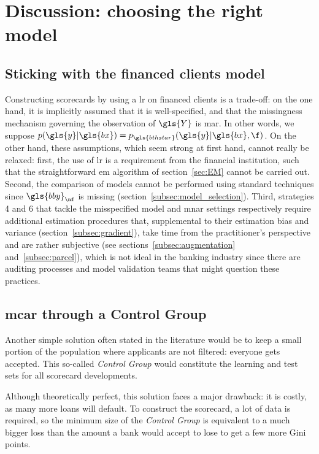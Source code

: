 \section{Discussion: choosing the right model} \label{sec:conclusion_reject}

\subsection{Sticking with the financed clients model}

Constructing scorecards by using a \gls{lr} on financed clients is a trade-off: on the one hand, it is implicitly assumed that it is well-specified, and that the missingness mechanism governing the observation of $\gls{Y}$ is \gls{mar}. In other words, we suppose $p(\gls{y} | \gls{bx}) = p_{\gls{bthstar}}(\gls{y} | \gls{bx}, \f)$. On the other hand, these assumptions, which seem strong at first hand, cannot really be relaxed: first, the use of \gls{lr} is a requirement from the financial institution, such that the straightforward \gls{em} algorithm of section~\ref{sec:EM} cannot be carried out. Second, the comparison of models cannot be performed using standard techniques since $\gls{bby}_{\nf}$ is missing (section~\ref{subsec:model_selection}). Third, strategies 4 and 6 that tackle the misspecified model and \gls{mnar} settings respectively require additional estimation procedures that, supplemental to their estimation bias and variance (section~\ref{subsec:gradient}), take time from the practitioner's perspective and are rather subjective (see sections~\ref{subsec:augmentation} and~\ref{subsec:parcel}), which is not ideal in the banking industry since there are auditing processes and model validation teams that might question these practices.

\subsection{\gls{mcar} through a Control Group}

Another simple solution often stated in the literature would be to keep a small portion of the population where applicants are not filtered: everyone gets accepted. This so-called \textit{Control Group} would constitute the learning and test sets for all scorecard developments.

Although theoretically perfect, this solution faces a major drawback: it is costly, as many more loans will default. To construct the scorecard, a lot of data is required, so the minimum size of the \textit{Control Group} is equivalent to a much bigger loss than the amount a bank would accept to lose to get a few more Gini points.

